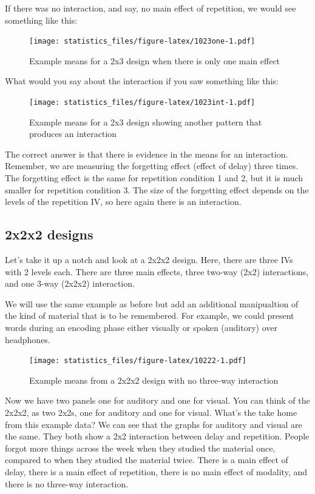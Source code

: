 \documentclass[]{book}
\begin{document}
If there was no interaction, and say, no main effect of repetition, we would see something like this:

\begin{figure}
\centering
\texttt{[image: statistics\_files/figure-latex/1023one-1.pdf]}
\caption{\label{fig:1023one}Example means for a 2x3 design when there is only one main effect}
\end{figure}

What would you say about the interaction if you saw something like this:

\begin{figure}
\centering
\texttt{[image: statistics\_files/figure-latex/1023int-1.pdf]}
\caption{\label{fig:1023int}Example means for a 2x3 design showing another pattern that produces an interaction}
\end{figure}

The correct answer is that there is evidence in the means for an interaction. Remember, we are measuring the forgetting effect (effect of delay) three times. The forgetting effect is the same for repetition condition 1 and 2, but it is much smaller for repetition condition 3. The size of the forgetting effect depends on the levels of the repetition IV, so here again there is an interaction.

\hypertarget{x2x2-designs}{%
\subsection{2x2x2 designs}\label{x2x2-designs}}

Let's take it up a notch and look at a 2x2x2 design. Here, there are three IVs with 2 levels each. There are three main effects, three two-way (2x2) interactions, and one 3-way (2x2x2) interaction.

We will use the same example as before but add an additional manipualtion of the kind of material that is to be remembered. For example, we could present words during an encoding phase either visually or spoken (auditory) over headphones.

\begin{figure}
\centering
\texttt{[image: statistics\_files/figure-latex/10222-1.pdf]}
\caption{\label{fig:10222}Example means from a 2x2x2 design with no three-way interaction}
\end{figure}

Now we have two panels one for auditory and one for visual. You can think of the 2x2x2, as two 2x2s, one for auditory and one for visual. What's the take home from this example data? We can see that the graphs for auditory and visual are the same. They both show a 2x2 interaction between delay and repetition. People forgot more things across the week when they studied the material once, compared to when they studied the material twice. There is a main effect of delay, there is a main effect of repetition, there is no main effect of modality, and there is no three-way interaction.
\end{document}
